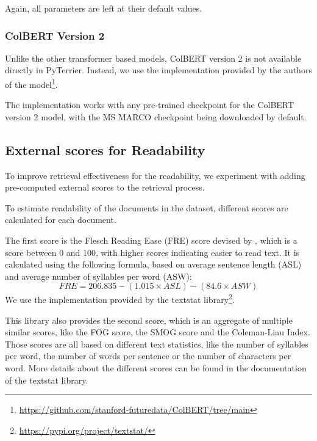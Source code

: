Again, all parameters are left at their default values.

\subsubsection{ColBERT Version 2}
Unlike the other transformer based models, ColBERT version 2 is not available directly in PyTerrier.
Instead, we use the implementation provided by the authors of the model\footnote{\url{https://github.com/stanford-futuredata/ColBERT/tree/main}}.

The implementation works with any pre-trained checkpoint for the ColBERT version 2 model, with the MS MARCO checkpoint being downloaded by default.

\subsection{External scores for Readability}\label{sec:external-scores}
To improve retrieval effectiveness for the readability, we experiment with adding pre-computed external scores to the retrieval process.

To estimate readability of the documents in the dataset, different scores are calculated for each document.

The first score is the Flesch Reading Ease (FRE) score devised by \cite{kincaid:1975:Derivation}, which is a score between 0 and 100, with higher scores indicating easier to read text.
It is calculated using the following formula, based on average sentence length (ASL) and average number of syllables per word (ASW):
\begin{equation}
    FRE = 206.835 - (1.015 \times ASL) - (84.6 \times ASW)
\end{equation}
We use the implementation provided by the textstat library\footnote{\url{https://pypi.org/project/textstat/}}.

This library also provides the second score, which is an aggregate of multiple similar scores, like the FOG score, the SMOG score and the Coleman-Liau Index.
Those scores are all based on different text statistics, like the number of syllables per word, the number of words per sentence or the number of characters per word.
More details about the different scores can be found in the documentation of the textstat library.

